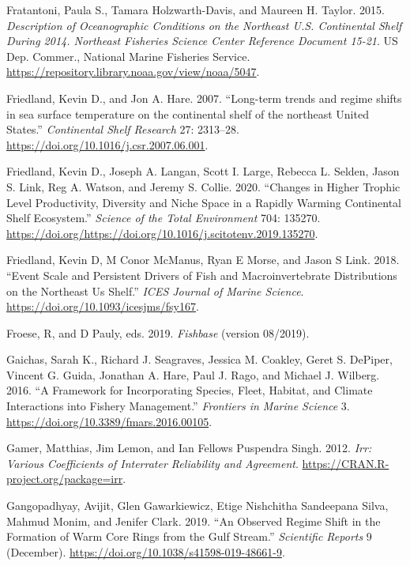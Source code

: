 \documentclass[
]{book}
\newlength{\cslhangindent}
\newenvironment{cslreferences}%
  {\setlength{\parindent}{0pt}%
  \everypar{\setlength{\hangindent}{\cslhangindent}}\ignorespaces}%
  {\par}
\begin{document}
\begin{cslreferences}
\leavevmode\hypertarget{ref-fratantoni_description_2015}{}%
Fratantoni, Paula S., Tamara Holzwarth-Davis, and Maureen H. Taylor. 2015. \emph{Description of Oceanographic Conditions on the Northeast U.S. Continental Shelf During 2014. Northeast Fisheries Science Center Reference Document 15-21}. US Dep. Commer., National Marine Fisheries Service. \url{https://repository.library.noaa.gov/view/noaa/5047}.

\leavevmode\hypertarget{ref-Friedland2007}{}%
Friedland, Kevin D., and Jon A. Hare. 2007. ``Long-term trends and regime shifts in sea surface temperature on the continental shelf of the northeast United States.'' \emph{Continental Shelf Research} 27: 2313--28. \url{https://doi.org/10.1016/j.csr.2007.06.001}.

\leavevmode\hypertarget{ref-friedland2020}{}%
Friedland, Kevin D., Joseph A. Langan, Scott I. Large, Rebecca L. Selden, Jason S. Link, Reg A. Watson, and Jeremy S. Collie. 2020. ``Changes in Higher Trophic Level Productivity, Diversity and Niche Space in a Rapidly Warming Continental Shelf Ecosystem.'' \emph{Science of the Total Environment} 704: 135270. \url{https://doi.org/https://doi.org/10.1016/j.scitotenv.2019.135270}.

\leavevmode\hypertarget{ref-Friedland2018}{}%
Friedland, Kevin D, M Conor McManus, Ryan E Morse, and Jason S Link. 2018. ``Event Scale and Persistent Drivers of Fish and Macroinvertebrate Distributions on the Northeast Us Shelf.'' \emph{ICES Journal of Marine Science}. \url{https://doi.org/10.1093/icesjms/fsy167}.

\leavevmode\hypertarget{ref-froese2019fishbase}{}%
Froese, R, and D Pauly, eds. 2019. \emph{Fishbase} (version 08/2019).

\leavevmode\hypertarget{ref-gaichas_framework_2016}{}%
Gaichas, Sarah K., Richard J. Seagraves, Jessica M. Coakley, Geret S. DePiper, Vincent G. Guida, Jonathan A. Hare, Paul J. Rago, and Michael J. Wilberg. 2016. ``A Framework for Incorporating Species, Fleet, Habitat, and Climate Interactions into Fishery Management.'' \emph{Frontiers in Marine Science} 3. \url{https://doi.org/10.3389/fmars.2016.00105}.

\leavevmode\hypertarget{ref-irr}{}%
Gamer, Matthias, Jim Lemon, and Ian Fellows Puspendra Singh. 2012. \emph{Irr: Various Coefficients of Interrater Reliability and Agreement}. \url{https://CRAN.R-project.org/package=irr}.

\leavevmode\hypertarget{ref-gangopadhyay2019}{}%
Gangopadhyay, Avijit, Glen Gawarkiewicz, Etige Nishchitha Sandeepana Silva, Mahmud Monim, and Jenifer Clark. 2019. ``An Observed Regime Shift in the Formation of Warm Core Rings from the Gulf Stream.'' \emph{Scientific Reports} 9 (December). \url{https://doi.org/10.1038/s41598-019-48661-9}.


\end{cslreferences}
\end{document}
